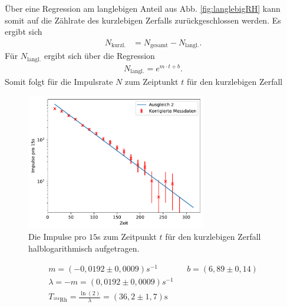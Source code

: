 Über eine Regression am langlebigen Anteil aus Abb. \ref{fig:langlebigRH} kann somit
auf die Zählrate des kurzlebigen Zerfalls zurückgeschlossen werden.
Es ergibt sich
\begin{align}
    N_{\text{kurzl.}}&=N_{\text{gesamt}}-N_{\text{langl.}}.
\end{align} 
Für $N_{\text{langl.}}$ ergibt sich über die Regression
\begin{align}
   N _{\text{langl.}}=e^{m \cdot t +b}.
\end{align}
Somit folgt für die Impulsrate $N$ zum Zeiptunkt $t$ für den kurzlebigen Zerfall
\begin{figure}
    \centering
    \includegraphics[width=0.7\textwidth]{plots/Rhodium_kurz.pdf}
    \caption{Die Impulse pro $15$s zum Zeitpunkt $t$ für den kurzlebigen Zerfall halblogarithmisch aufgetragen.}
\end{figure}
\begin{align*}
     m = (-0,0192 \pm 0,0009)\si{s^{-1}} && b = (6,89 \pm 0,14) \\
    \lambda = -m = (0,0192 \pm 0,0009)\si{s^{-1}} \\
    T_{^{104}\text{Rh}} = \frac{\ln(2)}{\lambda} = (36,2 \pm 1,7) \text{s}
\end{align*}
